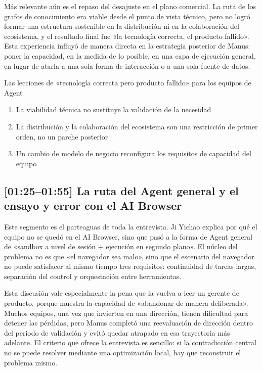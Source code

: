 Más relevante aún es el repaso del desajuste en el plano comercial. La ruta de los grafos de conocimiento era viable desde el punto de vista técnico, pero no logró formar una estructura sostenible en la distribución ni en la colaboración del ecosistema, y el resultado final fue «la tecnología correcta, el producto fallido». Esta experiencia influyó de manera directa en la estrategia posterior de Manus: poner la capacidad, en la medida de lo posible, en una capa de ejecución general, en lugar de atarla a una sola forma de interacción o a una sola fuente de datos.

\begin{importantbox}{Las lecciones de «tecnología correcta pero producto fallido» para los equipos de Agent}
\begin{enumerate}
    \item La viabilidad técnica no sustituye la validación de la necesidad
    \item La distribución y la colaboración del ecosistema son una restricción de primer orden, no un parche posterior
    \item Un cambio de modelo de negocio reconfigura los requisitos de capacidad del equipo
\end{enumerate}
\end{importantbox}

\subsection{[01:25--01:55] La ruta del Agent general y el ensayo y error con el AI Browser}

Este segmento es el parteaguas de toda la entrevista. Ji Yichao explica por qué el equipo no se quedó en el AI Browser, sino que pasó a la forma de Agent general de «sandbox a nivel de sesión + ejecución en segundo plano». El núcleo del problema no es que «el navegador sea malo», sino que el escenario del navegador no puede satisfacer al mismo tiempo tres requisitos: continuidad de tareas largas, separación del control y orquestación entre herramientas.

Esta discusión vale especialmente la pena que la vuelva a leer un gerente de producto, porque muestra la capacidad de «abandonar de manera deliberada». Muchos equipos, una vez que invierten en una dirección, tienen dificultad para detener las pérdidas, pero Manus completó una reevaluación de dirección dentro del periodo de validación y evitó quedar atrapado en esa trayectoria más adelante. El criterio que ofrece la entrevista es sencillo: si la contradicción central no se puede resolver mediante una optimización local, hay que reconstruir el problema mismo.


